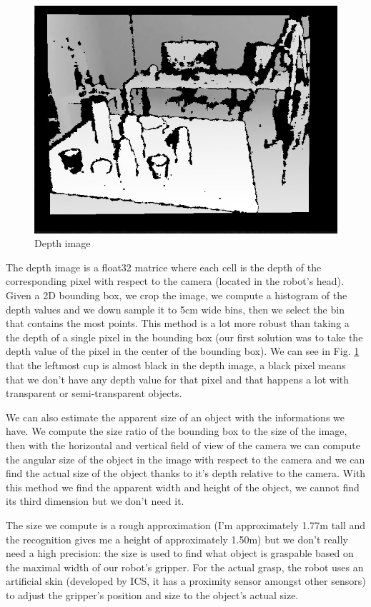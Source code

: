\documentclass[a4paper, twocolumn]{article}
\begin{document}
    \begin{figure}[!b]
        \includegraphics[width=\columnwidth]{../img/depth_image.jpg}
        \caption{Depth image}
        \label{depth_image}
    \end{figure}

    The depth image is a float32 matrice where each cell is the depth of the corresponding pixel with respect to the camera (located in the robot's head). Given a 2D bounding box, we crop the image, we compute a histogram of the depth values and we down sample it to 5cm wide bins, then we select the bin that contains the most points. This method is a lot more robust than taking a the depth of a single pixel in the bounding box (our first solution was to take the depth value of the pixel in the center of the bounding box). We can see in Fig. \ref{depth_image} that the leftmost cup is almost black in the depth image, a black pixel means that we don't have any depth value for that pixel and that happens a lot with transparent or semi-transparent objects.

    We can also estimate the apparent size of an object with the informations we have. We compute the size ratio of the bounding box to the size of the image, then with the horizontal and vertical field of view of the camera we can compute the angular size of the object in the image with respect to the camera and we can find the actual size of the object thanks to it's depth relative to the camera. With this method we find the apparent width and height of the object, we cannot find its third dimension but we don't need it.

    The size we compute is a rough approximation (I'm approximately 1.77m tall and the recognition gives me a height of approximately 1.50m) but we don't really need a high precision: the size is used to find what object is graspable based on the maximal width of our robot's gripper. For the actual grasp, the robot uses an artificial skin (developed by ICS, it has a proximity sensor amongst other sensors) to adjust the gripper's position and size to the object's actual size.
\end{document}
